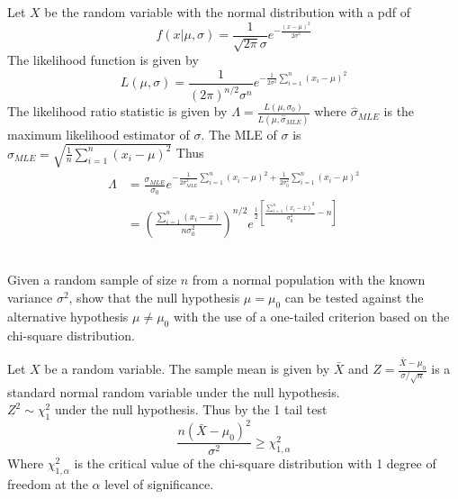\documentclass[answers,12pt,addpoints]{exam}
\begin{document}
\begin{questions}
    \begin{solution}
        Let $X$ be the random variable with the normal distribution with a pdf of 
        \[f(x|\mu, \sigma) = \frac{1}{\sqrt{2\pi}\sigma}e^{-\frac{(x-\mu)^2}{2\sigma^2}}\]
        The likelihood function is given by
        \[L(\mu, \sigma) = \frac{1}{(2\pi)^{n/2}\sigma^n}e^{-\frac{1}{2\sigma^2}\sum_{i=1}^{n}(x_i-\mu)^2}\]
        The likelihood ratio statistic is given by
        $\Lambda = \frac{L(\mu, \sigma_0)}{L(\mu, \hat{\sigma}_{MLE})}$
        where $\hat{\sigma}_{MLE}$ is the maximum likelihood estimator of $\sigma$.
        The MLE of $\sigma$ is $\hat{\sigma}_{MLE} = \sqrt{\frac{1}{n}\sum_{i=1}^{n}(x_i-\mu)^2}$
        Thus 
        \begin{align*}
            \Lambda &= \frac{\sigma_{MLE}}{\sigma_0} e^{-\frac{1}{2\sigma_{MLE}^2}\sum_{i=1}^{n}(x_i-\mu)^2 + \frac{1}{2\sigma_0^2}\sum_{i=1}^{n}(x_i-\mu)^2}\\
            &= (\frac{\sum_{i=1}^n(x_i-\bar{x})}{n \sigma^2_0})^{n/2}e^{\frac{1}{2} [ \frac{\sum_{i=1}^n(x_i -\bar{x})^2}{\sigma_0^2} - n]}
        \end{align*}

    \end{solution}

    \\
    Given a random sample of size \(n\) from a normal population with the known variance \(\sigma^2\),
    show that the null hypothesis \(\mu = \mu_0\) can be tested against the alternative hypothesis
    \(\mu \neq \mu_0\) with the use of a one-tailed criterion based on the chi-square distribution.

    \begin{solution}
        Let $X$ be a random variable. The sample mean is given by $\bar{X}$ and $Z = \frac{\bar{X} - \mu_0}{\sigma/\sqrt{n}}$ is a standard normal random variable under the null hypothesis. \\
        $Z^2 \sim \chi^2_1$ under the null hypothesis. Thus by the 1 tail test
        $$ \frac{n (\bar{X} - \mu_0)^2 }{\sigma^2} \geq \chi^2_{1, \alpha}$$
        Where $\chi^2_{1, \alpha}$ is the critical value of the chi-square distribution with 1 degree of freedom at the $\alpha$ level of significance.
    \end{solution}

\end{questions}
\end{document}

